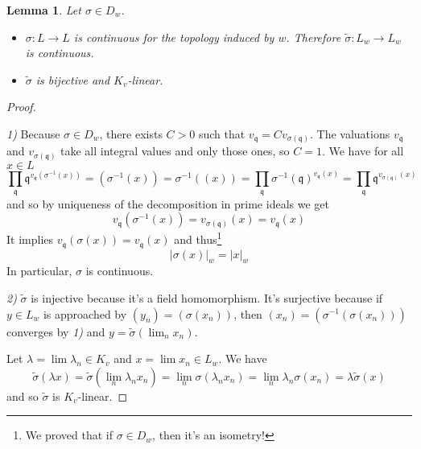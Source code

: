 \documentclass[12pt,a4paper,english]{article}
\theoremstyle{definition}
\theoremstyle{plain}
\newtheorem*{lem}{Lemma}
\begin{document}
\begin{lem}
Let $\sigma\in D_w$.
\begin{itemize}
\item[1)] $\sigma:L\to L$ is continuous for the topology induced by $w$. Therefore $\widetilde{\sigma}:L_w\to L_w$ is continuous.

\item[2)] $\widetilde{\sigma}$ is bijective and $K_v$-linear.
\end{itemize}
\end{lem}
\begin{proof}\textcolor{white}{Coucou !}

\textit{1)} Because $\sigma\in D_w$, there exists $C>0$ such that $v_\mathfrak{q}=Cv_{\sigma(\mathfrak{q})}$. The valuations $v_\mathfrak{q}$ and $v_{\sigma(\mathfrak{q})}$ take all integral values and only those ones, so $C=1$. We have for all $x\in L$
\begin{equation*}
\prod_\mathfrak{q}\mathfrak{q}^{v_\mathfrak{q}(\sigma^{-1}(x))}=(\sigma^{-1}(x))=\sigma^{-1}((x))=\prod_\mathfrak{q}\sigma^{-1}(\mathfrak{q})^{v_\mathfrak{q}(x)}=\prod_\mathfrak{q}\mathfrak{q}^{v_{\sigma(\mathfrak{q})}(x)}
\end{equation*}
and so by uniqueness of the decomposition in prime ideals we get
\begin{equation*}
v_\mathfrak{q}(\sigma^{-1}(x))=v_{\sigma(\mathfrak{q})}(x)=v_{\mathfrak{q}}(x)
\end{equation*}
It implies $v_\mathfrak{q}(\sigma(x))=v_{\mathfrak{q}}(x)$ and thus\footnote{We proved that if $\sigma\in D_w$, then it's an isometry!}
\begin{equation*}
|\sigma(x)|_w=|x|_w
\end{equation*}
In particular, $\sigma$ is continuous.

\textit{2)} $\widetilde{\sigma}$ is injective because it's a field homomorphism. It's surjective because if $y\in L_w$ is approached by $(y_n)=(\sigma(x_n))$, then $(x_n)=(\sigma^{-1}(\sigma(x_n)))$ converges by \textit{1)} and $y=\widetilde{\sigma}(\lim_n x_n)$.

Let $\lambda=\lim\lambda_n\in K_v$ and $x=\lim x_n\in L_w$. We have
\begin{equation*}
    \widetilde{\sigma}(\lambda x)=\widetilde{\sigma}(\lim_n\lambda_n x_n)=\lim_n \sigma(\lambda_n x_n)=\lim_n \lambda_n\sigma( x_n)=\lambda\widetilde{\sigma}(x)
\end{equation*}
and so $\widetilde{\sigma}$ is $K_v$-linear.
\end{proof}
\end{document}
